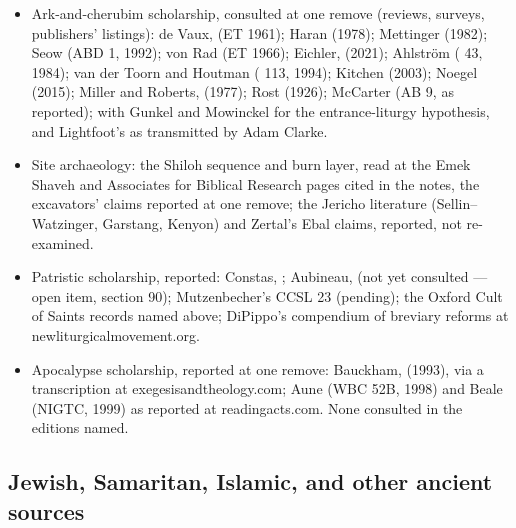 \begin{itemize}
{the Covenant} (1992).
\item Ark-and-cherubim scholarship, consulted at one remove (reviews,
surveys, publishers' listings): de Vaux,  (ET
1961); Haran (1978); Mettinger (1982); Seow (ABD 1, 1992); von Rad (ET
1966); Eichler,  (2021); Ahlstr\"om
( 43, 1984); van der Toorn and Houtman ( 113,
1994); Kitchen (2003); Noegel (2015); Miller and Roberts,  (1977); Rost (1926); McCarter (AB 9, as reported);
with Gunkel and Mowinckel for the entrance-liturgy hypothesis, and
Lightfoot's  as transmitted by Adam Clarke.
\item Site archaeology: the Shiloh sequence and burn layer, read at
the Emek Shaveh and Associates for Biblical Research pages cited in
the notes, the excavators' claims reported at one remove; the Jericho
literature (Sellin--Watzinger, Garstang, Kenyon) and Zertal's Ebal
claims, reported, not re-examined.
\item Patristic scholarship, reported: Constas, ;
Aubineau, 
(not yet consulted --- open item, section 90); Mutzenbecher's CCSL 23
(pending); the Oxford Cult of Saints records named above; DiPippo's
compendium of breviary reforms at newliturgicalmovement.org.
\item Apocalypse scholarship, reported at one remove: Bauckham,
 (1993), via a transcription at
exegesisandtheology.com; Aune (WBC 52B, 1998) and Beale (NIGTC, 1999)
as reported at readingacts.com. None consulted in the editions named.
\end{itemize}

\subsection*{Jewish, Samaritan, Islamic, and other ancient sources}

